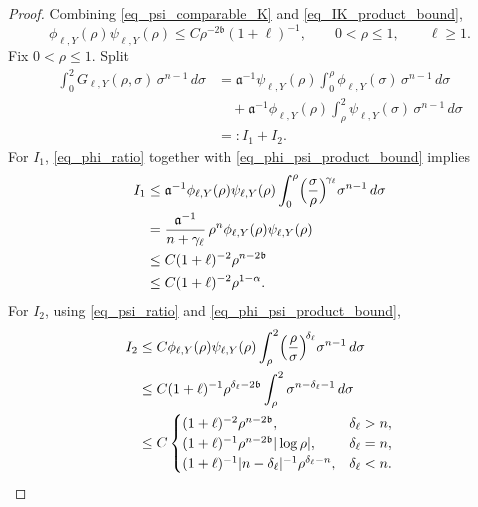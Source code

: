 \documentclass[10pt,a4paper]{amsart}
\begin{document}
\begin{proof}
Combining \eqref{eq_psi_comparable_K} and \eqref{eq_IK_product_bound},
\begin{equation}\label{eq_phi_psi_product_bound}
    \phi_{\ell,Y}(\rho)\psi_{\ell,Y}(\rho)
    \le
    C\rho^{-2\mathfrak b}(1+\ell)^{-1},
    \qquad
    0<\rho\leq1,
    \qquad
    \ell\ge 1.
\end{equation}
Fix $0<\rho\le 1$. Split
\begin{equation*}
\begin{aligned}
    \int_0^2 G_{\ell,Y}(\rho,\sigma) \, \sigma^{n-1} \, d\sigma
    &=
    \mathfrak a^{-1} \psi_{\ell,Y}(\rho)
    \int_0^\rho
        \phi_{\ell,Y}(\sigma)\,\sigma^{n-1}\,d\sigma          \\
    &\quad+
    \mathfrak a^{-1} \phi_{\ell,Y}(\rho)
    \int_\rho^2
        \psi_{\ell,Y}(\sigma)\,\sigma^{n-1}\,d\sigma          \\
    &=: I_1+I_2.
\end{aligned}
\end{equation*}
For $I_1$, \eqref{eq_phi_ratio} together with \eqref{eq_phi_psi_product_bound} implies
\begin{align}\label{eq_I1_bound_schur}
    I_1 &\le \mathfrak a^{-1} \phi_{\ell,Y}(\rho)\psi_{\ell,Y}(\rho) \int_0^\rho \Bigl(\frac{\sigma}{\rho}\Bigr)^{\!\gamma_\ell} \sigma^{n-1} \, d\sigma\\ \nonumber
    &= \frac{\mathfrak a^{-1}}{n+\gamma_\ell} \, \rho^n \phi_{\ell,Y}(\rho)\psi_{\ell,Y}(\rho)\\ \nonumber
    &\le C (1+\ell)^{-2}\rho^{n-2\mathfrak b}\\ \nonumber
    &\le C (1+\ell)^{-2}\rho^{1-\alpha}.
\end{align}
For $I_2$, using \eqref{eq_psi_ratio} and \eqref{eq_phi_psi_product_bound},
\begin{align*}
    I_2 &\le C\phi_{\ell,Y}(\rho)\psi_{\ell,Y}(\rho)
    \int_\rho^2 \Bigl(\frac{\rho}{\sigma}\Bigr)^{\!\delta_\ell}\sigma^{n-1} \, d\sigma \\
    &\le C (1+\ell)^{-1} \rho^{\delta_\ell - 2 \mathfrak b} \int_\rho^2 \sigma^{n-\delta_\ell - 1} \, d\sigma \\
    &\le C \begin{cases}
        (1+\ell)^{-2} \rho^{n-2\mathfrak b}, & \delta_\ell >n,\\
        (1+\ell)^{-1} \rho^{n-2\mathfrak b} |\log{\rho}|, & \delta_\ell = n,\\
        (1+\ell)^{-1} |n-\delta_\ell|^{-1} \rho^{\delta_\ell-n}, &\delta_\ell<n.
    \end{cases}

\end{align*}
\end{proof}
\end{document}
